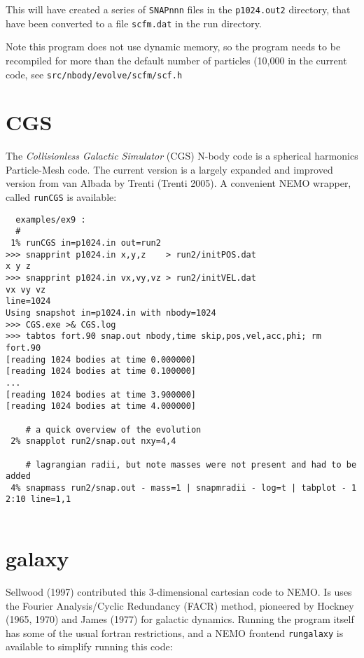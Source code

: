 This will have created a series of {\tt SNAPnnn} files in the {\tt p1024.out2}
directory, that have been converted to a file {\tt scfm.dat} in the 
run directory.

Note this program does not use dynamic memory, so the program needs to 
be recompiled for more than the default number of particles (10,000 in
the current code, see {\tt src/nbody/evolve/scfm/scf.h}

\section{CGS}

The {\it Collisionless Galactic Simulator} (CGS) N-body code is a spherical
harmonics Particle-Mesh code. The current version is a largely expanded and
improved version from van Albada by Trenti (Trenti 2005). A convenient
NEMO wrapper, called {\tt runCGS} is available:

\footnotesize\begin{verbatim}
  examples/ex9 :  
  #
 1% runCGS in=p1024.in out=run2 
>>> snapprint p1024.in x,y,z    > run2/initPOS.dat
x y z
>>> snapprint p1024.in vx,vy,vz > run2/initVEL.dat
vx vy vz
line=1024
Using snapshot in=p1024.in with nbody=1024
>>> CGS.exe >& CGS.log
>>> tabtos fort.90 snap.out nbody,time skip,pos,vel,acc,phi; rm fort.90
[reading 1024 bodies at time 0.000000]
[reading 1024 bodies at time 0.100000]
...
[reading 1024 bodies at time 3.900000]
[reading 1024 bodies at time 4.000000]

    # a quick overview of the evolution 
 2% snapplot run2/snap.out nxy=4,4

    # lagrangian radii, but note masses were not present and had to be added
 4% snapmass run2/snap.out - mass=1 | snapmradii - log=t | tabplot - 1 2:10 line=1,1


\end{verbatim}\normalsize




\section{galaxy}

Sellwood (1997) contributed this 3-dimensional cartesian code to NEMO. Is uses the
Fourier Analysis/Cyclic Redundancy (FACR) method, pioneered by
Hockney (1965, 1970) and James (1977) for galactic dynamics. Running
the program itself has some of the usual fortran 
restrictions, and a NEMO frontend {\tt rungalaxy}
is available to simplify running this code:

